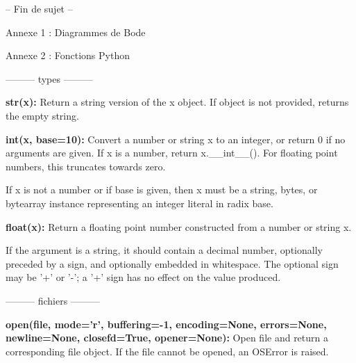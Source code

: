 \vspace{3 cm}

\begin{center}
-- Fin de sujet --
\end{center}

\vfill


\pagebreak
\begin{center}
\huge{Annexe 1 : Diagrammes de Bode}
\end{center}


\vfill

\pagebreak
\begin{center}
\huge{Annexe 2 : Fonctions Python}
\end{center}

\begin{center}
--------- types ---------
\end{center}


\textsf{\textbf{str(x):}} Return a string version of the x object. If object is not provided, returns the empty string.

\vspace{.5cm}

\textsf{\textbf{int(x, base=10):}} Convert a number or string x to an integer, or return 0 if no arguments are given. If x is a number, return x.\_\_int\_\_(). For floating point numbers, this truncates towards zero.

If x is not a number or if base is given, then x must be a string, bytes, or bytearray instance representing an integer literal in radix base.

\vspace{.5cm}

\textsf{\textbf{float(x):}} Return a floating point number constructed from a number or string x.

If the argument is a string, it should contain a decimal number, optionally preceded by a sign, and optionally embedded in whitespace. The optional sign may be '+' or '-'; a '+' sign has no effect on the value produced.

\begin{center}
--------- fichiers ---------
\end{center}

\textsf{\textbf{open(file, mode='r', buffering=-1, encoding=None, errors=None, newline=None,
closefd=True, opener=None):}} Open file and return a corresponding file object. If the file
cannot be opened, an OSError is raised.

